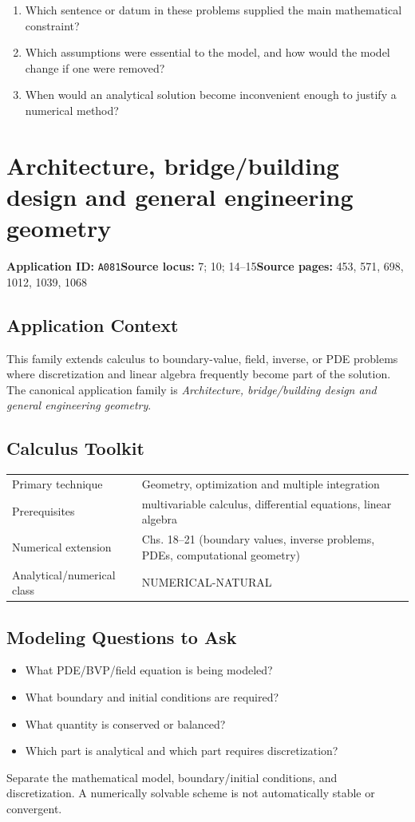 \documentclass[11pt]{book}
\newcommand{\pid}[1]{\texttt{#1}}
\begin{document}
\begin{reflectionbox}\begin{enumerate}
\item Which sentence or datum in these problems supplied the main mathematical constraint?
\item Which assumptions were essential to the model, and how would the model change if one were removed?
\item When would an analytical solution become inconvenient enough to justify a numerical method?
\end{enumerate}\end{reflectionbox}
\chapter{Architecture, bridge/building design and general engineering geometry}\label{app:A081}
\textbf{Application ID:} \pid{A081}\quad \textbf{Source locus:} 7; 10; 14–15\quad \textbf{Source pages:} 453, 571, 698, 1012, 1039, 1068
\section*{Application Context}
This family extends calculus to boundary-value, field, inverse, or PDE problems where discretization and linear algebra frequently become part of the solution. The canonical application family is \emph{Architecture, bridge/building design and general engineering geometry}.
\section*{Calculus Toolkit}
\begin{tabularx}{\textwidth}{@{}lX@{}}\toprule
Primary technique & Geometry, optimization and multiple integration \\
Prerequisites & multivariable calculus, differential equations, linear algebra \\
Numerical extension & Chs. 18–21 (boundary values, inverse problems, PDEs, computational geometry) \\
Analytical/numerical class & NUMERICAL-NATURAL \\
\bottomrule\end{tabularx}
\section*{Modeling Questions to Ask}\begin{itemize}
\item What PDE/BVP/field equation is being modeled?
\item What boundary and initial conditions are required?
\item What quantity is conserved or balanced?
\item Which part is analytical and which part requires discretization?
\end{itemize}
\begin{errorbox}Separate the mathematical model, boundary/initial conditions, and discretization. A numerically solvable scheme is not automatically stable or convergent.\end{errorbox}
\end{document}
